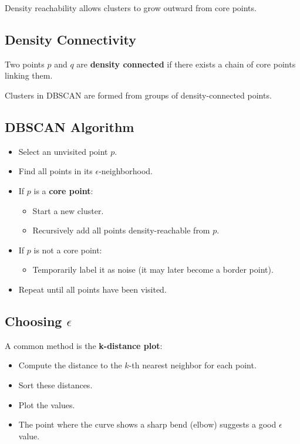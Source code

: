 \documentclass[10pt,a4paper]{article}
\begin{document}
	Density reachability allows clusters to grow outward from core points.

	\subsection{Density Connectivity}

	Two points $p$ and $q$ are \textbf{density connected} if there exists a chain of core points linking them.

	Clusters in DBSCAN are formed from groups of density-connected points.

	\subsection{DBSCAN Algorithm}

	\begin{itemize}

		\item Select an unvisited point $p$.

		\item Find all points in its $\epsilon$-neighborhood.

		\item If $p$ is a \textbf{core point}:
		\begin{itemize}
			\item Start a new cluster.
			\item Recursively add all points density-reachable from $p$.
		\end{itemize}

		\item If $p$ is not a core point:
		\begin{itemize}
			\item Temporarily label it as noise (it may later become a border point).
		\end{itemize}

		\item Repeat until all points have been visited.

	\end{itemize}

	\subsection{Choosing $\epsilon$}

	A common method is the \textbf{k-distance plot}:

	\begin{itemize}
		\item Compute the distance to the $k$-th nearest neighbor for each point.
		\item Sort these distances.
		\item Plot the values.
		\item The point where the curve shows a sharp bend (elbow) suggests a good $\epsilon$ value.
	\end{itemize}
\end{document}
